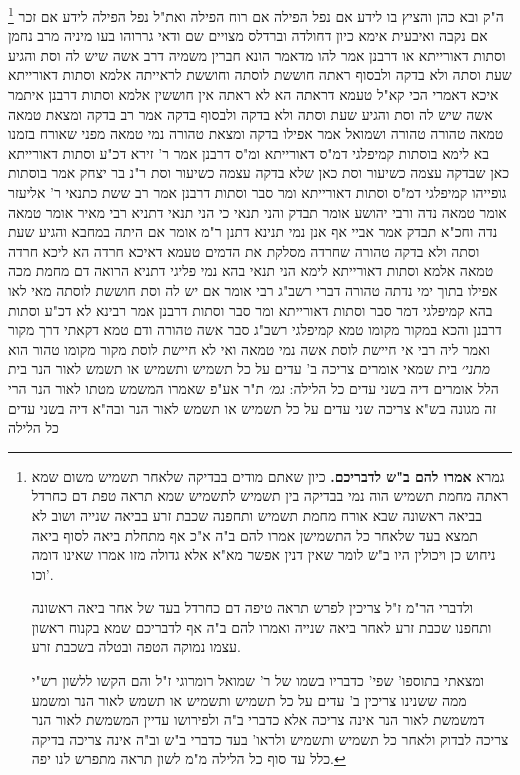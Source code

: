 \documentclass[12pt, openany]{book}
\newcommand{\footnotecomment}[1]{
	\renewcommand\thefootnote{}
	\footnote{#1}}
\newcommand{\commenta}[1]{\footnotecomment{#1}}
\begin{document}
{\commenta{גמרא \textbf{אמרו להם ב"ש לדבריכם.} כיון שאתם מודים בבדיקה שלאחר תשמיש משום שמא ראתה מחמת תשמיש הוה נמי בבדיקה בין תשמיש לתשמיש שמא תראה טפת דם כחרדל בביאה ראשונה שבא אורח מחמת תשמיש ותחפנה שכבת זרע בביאה שנייה ושוב לא תמצא בעד שלאחר כל התשמישן אמרו להם ב"ה א"כ אף מתחלת ביאה לסוף ביאה ניחוש כן ויכולין היו ב"ש לומר שאין דנין אפשר מא"א אלא גדולה מזו אמרו שאינו דומה וכו'.\par ולדברי הר"מ ז"ל צריכין לפרש תראה טיפה דם כחרדל בעד של אחר ביאה ראשונה ותחפנו שכבת זרע לאחר ביאה שנייה ואמרו להם ב"ה אף לדבריכם שמא בקנוח ראשון עצמו נמוקה הטפה ובטלה בשכבת זרע.\par ומצאתי בתוספו' שפי' כדבריו בשמו של ר' שמואל רומרוגי ז"ל והם הקשו ללשון רש"י ממה ששנינו צריכין ב' עדים על כל תשמיש ותשמיש או תשמש לאור הנר ומשמע דמשמשת לאור הנר אינה צריכה אלא כדברי ב"ה ולפירושו עדיין המשמשת לאור הנר צריכה לבדוק ולאחר כל תשמיש ותשמיש ולראו' בעד כדברי ב"ש וב"ה אינה צריכה בדיקה כלל עד סוף כל הלילה מ"מ לשון תראה מתפרש לנו יפה. }
ה"ק ובא כהן והציץ בו לידע אם נפל הפילה אם רוח הפילה ואת"ל נפל הפילה לידע אם זכר אם נקבה 
ואיבעית אימא כיון דחולדה וברדלס מצויים שם ודאי גררוהו 
בעו מיניה מרב נחמן וסתות דאורייתא או דרבנן 
אמר להו מדאמר הונא חברין משמיה דרב אשה שיש לה וסת והגיע שעת וסתה ולא בדקה ולבסוף ראתה חוששת לוסתה וחוששת לראייתה אלמא וסתות דאורייתא 
איכא דאמרי הכי קא"ל טעמא דראתה הא לא ראתה אין חוששין אלמא וסתות דרבנן 
איתמר אשה שיש לה וסת והגיע שעת וסתה ולא בדקה ולבסוף בדקה אמר רב בדקה ומצאת טמאה טמאה טהורה טהורה ושמואל אמר אפילו בדקה ומצאת טהורה נמי טמאה מפני שאורח בזמנו בא 
לימא בוסתות קמיפלגי דמ"ס דאורייתא ומ"ס דרבנן 
אמר ר' זירא דכ"ע וסתות דאורייתא כאן שבדקה עצמה כשיעור וסת כאן שלא בדקה עצמה כשיעור וסת 
ר"נ בר יצחק אמר בוסתות גופייהו קמיפלגי דמ"ס וסתות דאורייתא ומר סבר וסתות דרבנן 
אמר רב ששת כתנאי ר' אליעזר אומר טמאה נדה
ורבי יהושע אומר תבדק והני תנאי כי הני תנאי דתניא רבי מאיר אומר טמאה נדה וחכ"א תבדק 
אמר אביי אף אנן נמי תנינא דתנן ר"מ אומר אם היתה במחבא והגיע שעת וסתה ולא בדקה טהורה שחרדה מסלקת את הדמים טעמא דאיכא חרדה הא ליכא חרדה טמאה אלמא וסתות דאורייתא 
לימא הני תנאי בהא נמי פליגי דתניא הרואה דם מחמת מכה אפילו בתוך ימי נדתה טהורה דברי רשב"ג 
רבי אומר אם יש לה וסת חוששת לוסתה 
מאי לאו בהא קמיפלגי דמר סבר וסתות דאורייתא ומר סבר וסתות דרבנן 
אמר רבינא לא דכ"ע וסתות דרבנן והכא במקור מקומו טמא קמיפלגי 
רשב"ג סבר אשה טהורה ודם טמא דקאתי דרך מקור 
ואמר ליה רבי אי חיישת לוסת אשה נמי טמאה ואי לא חיישת לוסת מקור מקומו טהור הוא
{\large\emph{מתני׳}} בית שמאי אומרים צריכה ב' עדים על כל תשמיש ותשמיש או תשמש לאור הנר בית הלל אומרים דיה בשני עדים כל הלילה:
{\large\emph{גמ׳}} ת"ר אע"פ שאמרו המשמש מטתו לאור הנר הרי זה מגונה בש"א צריכה שני עדים על כל תשמיש או תשמש לאור הנר ובה"א דיה בשני עדים כל הלילה 
}
\end{document}
